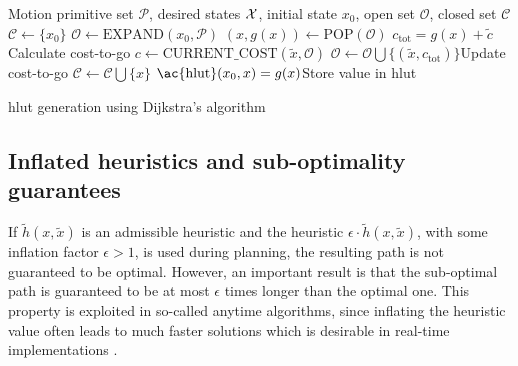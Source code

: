 \begin{algorithm}
    \begin{algorithmic}
        \Require Motion primitive set $\mathcal{P}$, desired states $\mathcal{X}$, initial state $x_0$, open set $\mathcal{O}$, closed set $\mathcal{C}$
            \State $\mathcal{C}\gets \{x_0\}$
            \State $\mathcal{O}\gets\text{EXPAND}(x_0, \mathcal{P})$
                \State $(x,g(x))\gets \text{POP}(\mathcal{O})$
                        \State $c_{\text{tot}}=g(x) + \tilde{c}$ \Comment Calculate cost-to-go
                        \State $c\gets\text{CURRENT\_COST}(\tilde{x}, \mathcal{O})$
                            \State $\mathcal{O}\gets\mathcal{O}\bigcup\{(\tilde{x},c_{\text{tot}})\}$\Comment Update cost-to-go
                        \EndIf
                    \EndIf
                \EndFor
            \State $\mathcal{C}\gets\mathcal{C}\bigcup \{x\}$
            \State $\text{\ac{hlut}}(x_0,x)=g(x)$\Comment Store value in \ac{hlut}
            \EndWhile
        \end{algorithmic}
        \caption{\ac{hlut} generation using Dijkstra's algorithm}
        \label{alg:hlut}
\end{algorithm}

\subsection{Inflated heuristics and sub-optimality guarantees}\label{sec:sub_optimal}
If $\tilde{h}(x, \tilde{x})$ is an admissible heuristic and the heuristic $\epsilon\cdot\tilde{h}(x, \tilde{x})$, with some inflation factor $\epsilon>1$, is used during planning,
the resulting path is not guaranteed to be optimal. However, an important result is that the sub-optimal path is guaranteed to be at most $\epsilon$ times 
longer than the optimal one. This property is exploited in so-called anytime algorithms, since inflating the heuristic value often leads to much faster solutions which is 
desirable in real-time implementations \cite{anytime_astar}. 